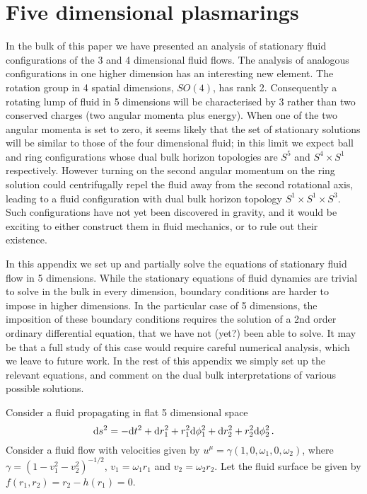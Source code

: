 
\section{Five dimensional plasmarings}\label{sec:5dim}

In the bulk of this paper we  have presented an analysis of
stationary fluid configurations of the 3 and 4 dimensional fluid
flows. The analysis of analogous configurations in one higher
dimension has an interesting new element. The rotation group in 4
spatial dimensions, $SO(4)$, has rank 2. Consequently a rotating
lump of fluid in 5 dimensions will be characterised by 3 rather than
two conserved charges (two angular momenta plus energy). When one of
the two angular momenta is set to zero, it seems likely that the set
of stationary solutions will be similar to those of the four
dimensional fluid; in this limit we expect ball and ring
configurations whose dual bulk horizon topologies are $S^5$ and
$S^4\times S^1$ respectively. However turning on the second angular
momentum on the ring solution could centrifugally repel the fluid
away from the second rotational axis, leading to a fluid
configuration with dual bulk horizon topology $S^1\times S^1\times
S^3$. Such configurations have not yet been discovered in gravity,
and it would be exciting to either construct them in fluid
mechanics, or to rule out their existence.

In this appendix we set up and partially solve the equations of
stationary fluid flow in 5 dimensions. While the stationary
equations of fluid dynamics are trivial to solve in the bulk in
every dimension, boundary conditions are harder to impose in higher
dimensions. In the particular case of 5 dimensions, the imposition
of these boundary conditions requires the solution of a 2nd order
ordinary differential equation, that we have not (yet?) been able to
solve. It may be that a full study of this case would require
careful numerical analysis, which we leave to future work. In the
rest of this appendix we simply set up the relevant equations, and
comment on the dual bulk interpretations of various possible
solutions.

Consider a fluid propagating in flat 5 dimensional space
%
\begin{equation*}
  \mathrm{d} s^2 = -\mathrm{d} t^2 + \mathrm{d} r_1^2 + r_1^2 \mathrm{d} \phi_1^2
              + \mathrm{d} r_2^2 + r_2^2 \mathrm{d} \phi_2^2\,.
\end{equation*}
%
Consider a fluid flow with velocities given by
$u^\mu=\gamma(1,0,\omega_1,0,\omega_2)$, where
$\gamma=(1-v_1^2-v_2^2)^{-1/2}$, $v_1=\omega_1r_1$ and
$v_2=\omega_2r_2$. Let the fluid surface be given by
$f(r_1,r_2)=r_2-h(r_1)=0$.

